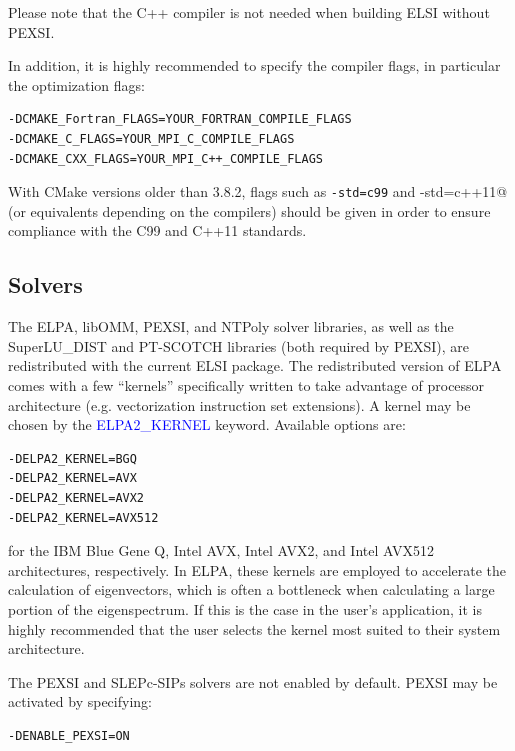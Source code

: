 \documentclass{report}
\begin{document}
Please note that the C++ compiler is not needed when building ELSI without PEXSI.

In addition, it is highly recommended to specify the compiler flags, in particular the optimization flags:
\begin{tcolorbox}
\begin{verbatim}
-DCMAKE_Fortran_FLAGS=YOUR_FORTRAN_COMPILE_FLAGS
-DCMAKE_C_FLAGS=YOUR_MPI_C_COMPILE_FLAGS
-DCMAKE_CXX_FLAGS=YOUR_MPI_C++_COMPILE_FLAGS
\end{verbatim}
\end{tcolorbox}

With CMake versions older than 3.8.2, flags such as \verb+-std=c99+ and \verb@-std=c++11@ (or equivalents depending on the compilers) should be given in order to ensure compliance with the C99 and C++11 standards.

\subsection{Solvers}
\label{subsec:config_solvers}
The ELPA, libOMM, PEXSI, and NTPoly solver libraries, as well as the SuperLU\_DIST and PT-SCOTCH libraries (both required by PEXSI), are redistributed with the current ELSI package.  The redistributed version of ELPA comes with a few ``kernels'' specifically written to take advantage of processor architecture (e.g. vectorization instruction set extensions).  A kernel may be chosen by the \textcolor{blue}{ELPA2\_KERNEL} keyword.  Available options are:
\begin{tcolorbox}
\begin{verbatim}
-DELPA2_KERNEL=BGQ
-DELPA2_KERNEL=AVX
-DELPA2_KERNEL=AVX2
-DELPA2_KERNEL=AVX512
\end{verbatim}
\end{tcolorbox}

for the IBM Blue Gene Q, Intel AVX, Intel AVX2, and Intel AVX512 architectures, respectively.  In ELPA, these kernels are employed to accelerate the calculation of eigenvectors, which is often a bottleneck when calculating a large portion of the eigenspectrum.  If this is the case in the user's application, it is highly recommended that the user selects the kernel most suited to their system architecture.

The PEXSI and SLEPc-SIPs solvers are not enabled by default.  PEXSI may be activated by specifying:
\begin{tcolorbox}
\begin{verbatim}
-DENABLE_PEXSI=ON
\end{verbatim}
\end{tcolorbox}
\end{document}
